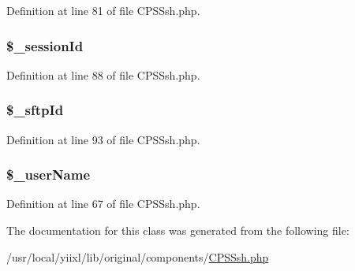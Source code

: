 Definition at line 81 of file CPSSsh.php.

\hypertarget{classCPSSsh_a7ee516ff732b630349455f5c9f9c85a8}{
\subsubsection[{\$\_\-sessionId}]{\setlength{\rightskip}{0pt plus 5cm}\$\_\-sessionId}}
\label{classCPSSsh_a7ee516ff732b630349455f5c9f9c85a8}


Definition at line 88 of file CPSSsh.php.

\hypertarget{classCPSSsh_ae9e1f0a5c641603ae7ed3388ae8a2368}{
\subsubsection[{\$\_\-sftpId}]{\setlength{\rightskip}{0pt plus 5cm}\$\_\-sftpId}}
\label{classCPSSsh_ae9e1f0a5c641603ae7ed3388ae8a2368}


Definition at line 93 of file CPSSsh.php.

\hypertarget{classCPSSsh_adad05d8340094323803ec5acd86329a1}{
\subsubsection[{\$\_\-userName}]{\setlength{\rightskip}{0pt plus 5cm}\$\_\-userName}}
\label{classCPSSsh_adad05d8340094323803ec5acd86329a1}


Definition at line 67 of file CPSSsh.php.



The documentation for this class was generated from the following file:\begin{DoxyCompactItemize}
\item 
/usr/local/yiixl/lib/original/components/\hyperlink{CPSSsh_8php}{CPSSsh.php}\end{DoxyCompactItemize}
